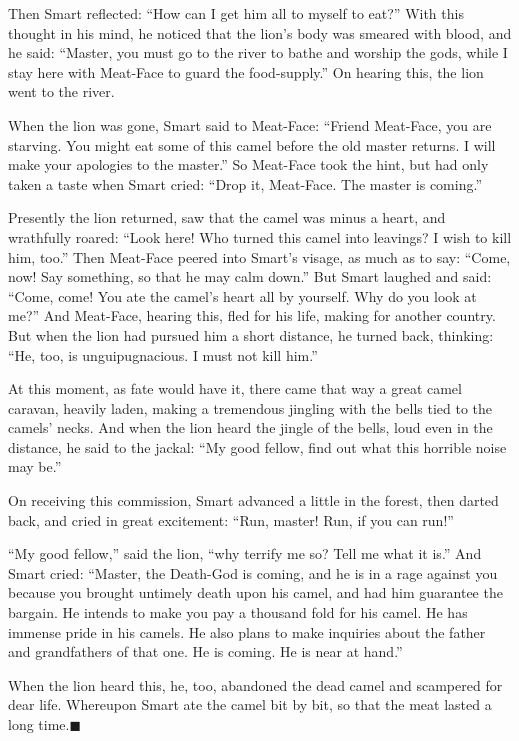 \documentclass[article, twoside, 14pt]{memoir}
\newcommand{\qed}{\hfill \ensuremath{\blacksquare}}
\begin{document}
Then Smart reflected: ``How can I get him all to myself to eat?''
With this thought in his mind, he noticed that the lion's body was
smeared with blood, and he said:
``Master, you must go to the river to bathe and worship the gods, while I stay here with Meat-Face to guard the food-supply.''
On hearing this, the lion went to the river.

When the lion was gone, Smart said to Meat-Face:
``Friend Meat-Face, you are starving. You might eat some of this camel before the old master returns. I will make your apologies to the master.''
So Meat-Face took the hint, but had only taken a taste when Smart
cried: ``Drop it, Meat-Face. The master is coming.''

Presently the lion returned, saw that the camel was minus a heart,
and wrathfully roared:
``Look here! Who turned this camel into leavings? I wish to kill him, too.''
Then Meat-Face peered into Smart's visage, as much as to say:
``Come, now! Say something, so that he may calm down.'' But Smart
laughed and said:
``Come, come! You ate the camel's heart all by yourself. Why do you look at me?''
And Meat-Face, hearing this, fled for his life, making for another
country. But when the lion had pursued him a short distance, he
turned back, thinking:
``He, too, is unguipugnacious. I must not kill him.''

At this moment, as fate would have it, there came that way a great
camel caravan, heavily laden, making a tremendous jingling with the
bells tied to the camels' necks. And when the lion heard the jingle
of the bells, loud even in the distance, he said to the jackal:
``My good fellow, find out what this horrible noise may be.''

On receiving this commission, Smart advanced a little in the
forest, then darted back, and cried in great excitement:
``Run, master! Run, if you can run!''

``My good fellow,'' said the lion,
``why terrify me so? Tell me what it is.'' And Smart cried:
``Master, the Death-God is coming, and he is in a rage against you because you brought untimely death upon his camel, and had him guarantee the bargain. He intends to make you pay a thousand fold for his camel. He has immense pride in his camels. He also plans to make inquiries about the father and grandfathers of that one. He is coming. He is near at hand.''

When the lion heard this, he, too, abandoned the dead camel and
scampered for dear life. Whereupon Smart ate the camel bit by bit,
so that the meat lasted a long time.\hyperref[s24]{\qed}
\end{document}
